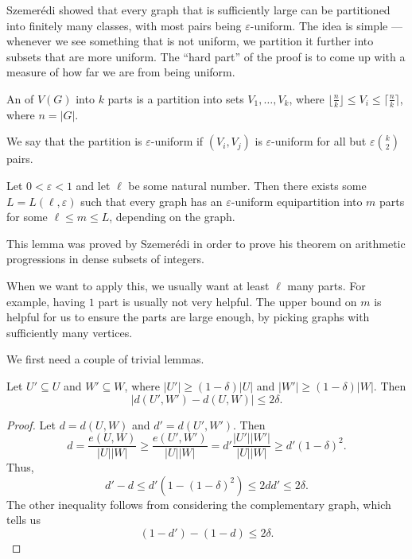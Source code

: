 \documentclass[a4paper]{article}
\begin{document}
Szemer\'edi showed that every graph that is sufficiently large can be partitioned into finitely many classes, with most pairs being $\varepsilon$-uniform. The idea is simple --- whenever we see something that is not uniform, we partition it further into subsets that are more uniform. The ``hard part'' of the proof is to come up with a measure of how far we are from being uniform.

\begin{defi}[Equipartition]
  An  of $V(G)$ into $k$ parts is a partition into sets $V_1, \ldots, V_k$, where $\lfloor \frac{n}{k} \rfloor \leq V_i \leq \lceil \frac{n}{k}\rceil$, where $n = |G|$.

  We say that the partition is $\varepsilon$-uniform if $(V_i, V_j)$ is $\varepsilon$-uniform for all but $\varepsilon \binom{k}{2}$ pairs.
\end{defi}


\begin{thm}
  Let $0 < \varepsilon < 1$ and let $\ell$ be some natural number. Then there exists some $L = L(\ell, \varepsilon)$ such that every graph has an $\varepsilon$-uniform equipartition into $m$ parts for some $\ell \leq m \leq L$, depending on the graph.
\end{thm}
This lemma was proved by Szemer\'edi in order to prove his theorem on arithmetic progressions in dense subsets of integers.

When we want to apply this, we usually want at least $\ell$ many parts. For example, having $1$ part is usually not very helpful. The upper bound on $m$ is helpful for us to ensure the parts are large enough, by picking graphs with sufficiently many vertices.

We first need a couple of trivial lemmas.
\begin{lemma}
  Let $U' \subseteq U$ and $W' \subseteq W$, where $|U'| \geq (1 - \delta)|U|$ and $|W'| \geq (1 - \delta) |W|$. Then
  \[
    |d(U', W') - d(U, W)| \leq 2\delta.
  \]
\end{lemma}

\begin{proof}
  Let $d = d(U, W)$ and $d' = d(U', W')$. Then
  \[
    d = \frac{e(U, W)}{|U||W|} \geq \frac{e(U', W')}{|U||W|} = d' \frac{|U'||W'|}{|U||W|} \geq d' (1 - \delta)^2.
  \]
  Thus,
  \[
    d' - d \leq d'(1 - (1 - \delta)^2) \leq 2d d' \leq 2 \delta.
  \]
  The other inequality follows from considering the complementary graph, which tells us
  \[
    (1 - d') - (1 - d) \leq 2\delta.
  \]
\end{proof}
\end{document}
